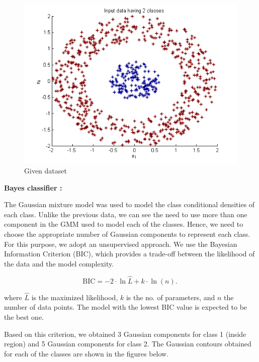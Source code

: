\documentclass{article}
\begin{document}
\begin{figure}[H]
\centering
\includegraphics[width=\linewidth]{Classification/nonlinearlySeparable/input_data.png}
\caption{Given dataset}
\end{figure}


\textbf{Bayes classifier :}  \\[10pt]
\begin{flushleft}

The Gaussian mixture model was used to model the class conditional densities of each class. Unlike the previous data, we can see the need to use more than one component in the GMM used to model each of the classes. Hence, we need to choose the appropriate number of Gaussian components to represent each class.
\\[10pt]

For this purpose, we adopt an unsupervised approach. We use the Bayesian Information Criterion (BIC), which provides a trade-off between the likelihood of the data and the model complexity.

\[ \mathrm{BIC} = {-2 \cdot \ln{\hat L} + k \cdot \ln(n)}. \ \]

where $\hat L$ is the maximized likelihood, $k$ is the no. of parameters, and $n$ the number of data points. The model with the lowest BIC value is expected to be the best one.


Based on this criterion, we obtained 3 Gaussian components for class 1 (inside region) and 5 Gaussian components for class 2. The Gaussian contours obtained for each of the classes are shown in the figures below.



\end{flushleft}
\end{document}
